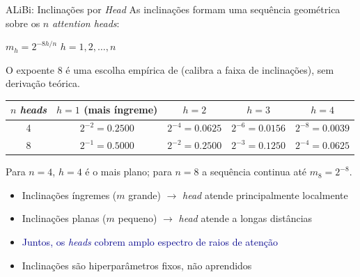 \documentclass[aspectratio=169, xcolor=dvipsnames]{beamer}
\begin{document}
  \begin{frame}{ALiBi: Inclinações por \textit{Head}}
    As inclinações formam uma sequência geométrica sobre os $n$ \textit{attention heads}:

    \begin{block}{}
      $m_h = 2^{-8h/n}$ \qquad $h = 1, 2, \ldots, n$
    \end{block}

    {\small O expoente $8$ é uma escolha empírica de \cite{press2022alibi} (calibra a faixa de inclinações), sem derivação teórica.}

    \centering
    {\small
    \begin{tabular}{ccccc}
      \toprule
      $n$ \textit{heads} & $h{=}1$ (mais íngreme) & $h{=}2$ & $h{=}3$ & $h{=}4$ \\
      \midrule
      4 & $2^{-2} = 0.2500$ & $2^{-4} = 0.0625$ & $2^{-6} = 0.0156$ & $2^{-8} = 0.0039$ \\
      8 & $2^{-1} = 0.5000$ & $2^{-2} = 0.2500$ & $2^{-3} = 0.1250$ & $2^{-4} = 0.0625$ \\
      \bottomrule
    \end{tabular}}

    {\scriptsize Para $n{=}4$, $h{=}4$ é o mais plano; para $n{=}8$ a sequência continua até $m_8 = 2^{-8}$.}

    \flushleft
    \begin{itemize}
      \item Inclinações íngremes ($m$ grande) $\to$ \textit{head} atende principalmente localmente
      \item Inclinações planas ($m$ pequeno) $\to$ \textit{head} atende a longas distâncias
      \item \textcolor{DarkBlue}{Juntos, os \textit{heads} cobrem amplo espectro de raios de atenção}
      \item Inclinações são hiperparâmetros fixos, não aprendidos
    \end{itemize}
  \end{frame}
\end{document}
